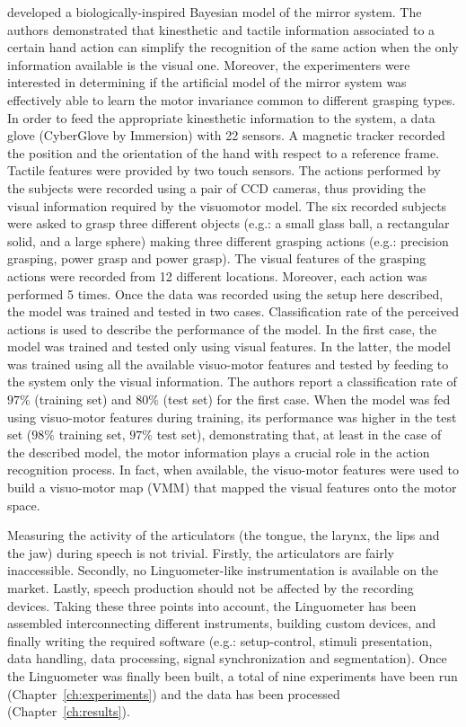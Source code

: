 \citet{metta.etal:2006} developed a biologically-inspired Bayesian model of
the mirror system.
The authors demonstrated that kinesthetic and tactile information associated to
a certain hand action can simplify the recognition of the same action when the
only information available is the visual one.
Moreover, the experimenters were interested in determining if the artificial
model
of the mirror system was effectively able to learn the motor invariance common
to different grasping types.
In order to feed the appropriate kinesthetic information to the system, a data
glove (CyberGlove by Immersion) with 22 sensors.
A magnetic tracker recorded the position and the orientation of the hand with
respect to a reference frame.
Tactile features were provided by two touch sensors. The actions performed by
the subjects were recorded using a pair of CCD cameras, thus providing the
visual information required by the visuomotor model. 
The six recorded subjects were asked to grasp three different objects 
(e.g.: a small glass ball, a rectangular solid, and a large sphere) making three
different grasping actions (e.g.: precision grasping, power grasp and power
grasp).
The visual features of the grasping actions were recorded from 12 different
locations. Moreover, each action was performed 5 times.
Once the data was recorded using the setup here described, the model was
trained and tested in two cases. Classification rate of the perceived actions is
used to describe the performance of the model.
In the first case, the model was trained and tested only using visual
features.
In the latter, the model was trained using all the available visuo-motor 
features and tested by feeding to the system only the visual
information.
The authors report a classification rate of $97\%$ (training set) and $80\%$
(test set) for the first case. 
When the model was fed using visuo-motor features during training, its
performance was higher in the test set ($98\%$ training set, $97\%$ test 
set), demonstrating that, at least in the case of the described model, the
motor information plays a crucial role in the action recognition process.
In fact, when available, the visuo-motor features were used to build a
visuo-motor map (VMM) that mapped the visual features onto the motor space.

Measuring the activity of the articulators (the tongue, the larynx, the lips and
the jaw) during speech is not trivial. 
Firstly, the articulators are fairly inaccessible.
Secondly, no Linguometer-like instrumentation is available on the market.
Lastly, speech production should not be affected by the recording devices.
Taking these three points into account, the Linguometer has been assembled 
interconnecting different instruments, building custom devices, and finally
writing the required software (e.g.: setup-control, stimuli presentation, data
handling, data processing, signal synchronization and segmentation).
Once the Linguometer was finally been built, a total of nine
experiments have been run (Chapter~\ref{ch:experiments}) and the data has been
processed (Chapter~\ref{ch:results}).\\

